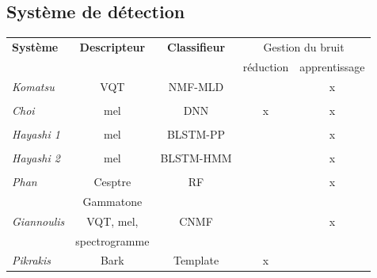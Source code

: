 \subsection{Système de détection}

\begin{table}[t]
\begin{center}
\scriptsize
\begin{tabular}{lcccc}
\textbf{Système}             & \textbf{Descripteur}         & \textbf{Classifieur} &   \multicolumn{2}{c}{Gestion du bruit} \\ 
                             &                              &                      & réduction & apprentissage   \\ 
\hline
\emph{Komatsu}               &     VQT                      & NMF-MLD              &           & x \\ 
\citep{Komatsu2016}          &                              &                      &           &   \\ 
\hline
\emph{Choi}                  &     mel                      & DNN                  & x         & x \\ 
\citep{Choi2016}             &                              &                      &           & \\ 
\hline
\emph{Hayashi 1}             &     mel                      & BLSTM-PP             &           & x \\ 
\citep{Hayashi2016}          &                              &                      &           & \\ 
\hline
\emph{Hayashi 2}             &     mel                      & BLSTM-HMM            &           & x \\ 
\citep{Hayashi2016}          &                              &                      &           & \\ 
\hline
\emph{Phan}                  &     Cesptre                  & RF       &           & x\\ 
\citep{Phan2016}             &     Gammatone                &                      &           & \\ 
\hline
\emph{Giannoulis}            &     VQT, mel,                & CNMF                 &           & x\\ 
\citep{Giannoulis2016}       &     spectrogramme            &                      &           & \\ 
\hline
\emph{Pikrakis}              &     Bark                     & Template             & x         & \\ 

\end{tabular}
\end{center}
\end{table}
